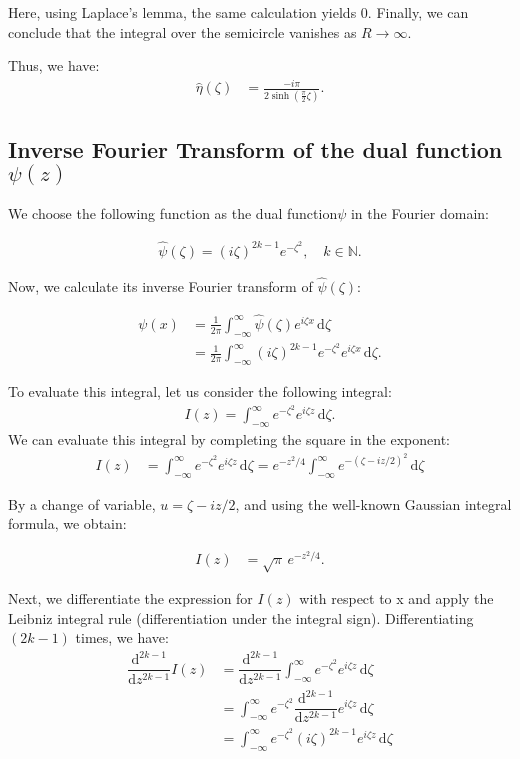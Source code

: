 \documentclass[a4paper,12pt]{article}
\newcommand{\z}{\zeta}
\newcommand{\dd}{\mathrm{d}}
\newcommand{\diff}[2]{\dfrac{\dd #1}{\dd #2}}
\newcommand{\psihat}{\widehat{\psi}}
\newcommand{\etahat}{\widehat{\eta}}
\begin{document}
Here, using Laplace's lemma, the same calculation yields 0.
Finally, we can conclude that the integral over the semicircle vanishes as $R \to \infty$.

\bigskip

Thus, we have:
\begin{align*}
  \etahat(\z) &= \frac{-i\pi}{2\sinh\left(\frac{\pi}{2} \z\right)}.
\end{align*}

\subsection{Inverse Fourier Transform of the dual function $\psi(z)$}

We choose the following function as the dual function$\psi$ in the Fourier domain:

\begin{align}
  \psihat(\z) = (i \z)^{2k-1} e^{-\z^2}, \quad k \in \mathbb{N}.
\end{align}

Now, we calculate its inverse Fourier transform of $\psihat(\z)$:

\begin{align*}
  \psi(x) &= \frac{1}{2\pi}\int_{-\infty}^{\infty} \psihat(\z) e^{i \z x} \, \dd\z \\
  &= \frac{1}{2\pi}\int_{-\infty}^{\infty} (i\z)^{2k-1} e^{-\z^2} e^{i \z x} \, \dd\z.
\end{align*}

To evaluate this integral, let us consider the following integral:
\begin{align}
  I(z) = \int_{-\infty}^{\infty} e^{-\z^2} e^{i \z z} \, \dd\z.
\end{align}
We can evaluate this integral by completing the square in the exponent:
  \begin{align*}
    I(z) &= \int_{-\infty}^{\infty} e^{-\z^2} e^{i \z z} \, \dd\z 
    = e^{-z^2/4} \int_{-\infty}^{\infty} e^{-(\z - iz/2)^2} \, \dd\z
  \end{align*}

  By a change of variable, $u = \z - iz/2$, and using the well-known Gaussian integral formula, we obtain:

  \begin{align*}
    I(z) &= \sqrt{\pi} \, e^{-z^2/4}.
  \end{align*}

Next, we differentiate the expression for $I(z)$ with respect to x and apply the Leibniz integral rule (differentiation under the integral sign). Differentiating $(2k-1)$ times, we have:
  \begin{align*}
    \diff{^{2k-1}}{z^{2k-1}} I(z) &= \diff{^{2k-1}}{z^{2k-1}} \int_{-\infty}^{\infty} e^{-\z^2} e^{i \z z} \, \dd\z \\
    &= \int_{-\infty}^{\infty} e^{-\z^2} \diff{^{2k-1}}{z^{2k-1}} e^{i \z z} \, \dd\z \\
    &= \int_{-\infty}^{\infty} e^{-\z^2} (i \z)^{2k-1} e^{i \z z} \, \dd\z \\
  \end{align*}
\end{document}
